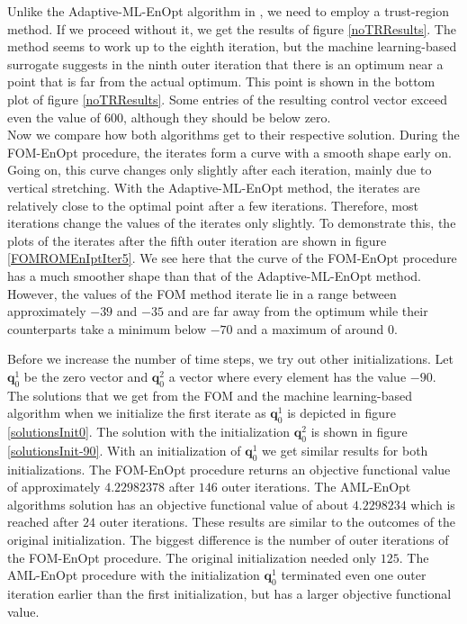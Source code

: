 Unlike the Adaptive-ML-EnOpt algorithm in \cite{Keil2022-dj}, we need to employ a trust-region method. If we proceed without it, we get the results of figure \ref{noTRResults}. The method seems to work up to the eighth iteration, but the machine learning-based surrogate suggests in the ninth outer iteration that there is an optimum near a point that is far from the actual optimum. This point is shown in the bottom plot of figure \ref{noTRResults}. Some entries of the resulting control vector exceed even the value of $600$, although they should be below zero.\\

Now we compare how both algorithms get to their respective solution. During the FOM-EnOpt procedure, the iterates form a curve with a smooth shape early on. Going on, this curve changes only slightly after each iteration, mainly due to vertical stretching. With the Adaptive-ML-EnOpt method, the iterates are relatively close to the optimal point after a few iterations. Therefore, most iterations change the values of the iterates only slightly. To demonstrate this, the plots of the iterates after the fifth outer iteration are shown in figure \ref{FOMROMEnIptIter5}. We see here that the curve of the FOM-EnOpt procedure has a much smoother shape than that of the Adaptive-ML-EnOpt method. However, the values of the FOM method iterate lie in a range between approximately $-39$ and $-35$ and are far away from the optimum while their counterparts take a minimum below $-70$ and a maximum of around $0$.

Before we increase the number of time steps, we try out other initializations. Let $\mathbf{q}^1_0$ be the zero vector and $\mathbf{q}^2_0$ a vector where every element has the value $-90$. The solutions that we get from the FOM and the machine learning-based algorithm when we initialize the first iterate as $\mathbf{q}^1_0$ is depicted in figure \ref{solutionsInit0}. The solution with the initialization $\mathbf{q}^2_0$ is shown in figure \ref{solutionsInit-90}. With an initialization of $\mathbf{q}^1_0$ we get similar results for both initializations. The FOM-EnOpt procedure returns an objective functional value of approximately $4.22982378$ after $146$ outer iterations. The AML-EnOpt algorithms solution has an objective functional value of about $4.2298234$ which is reached after $24$ outer iterations. These results are similar to the outcomes of the original initialization. The biggest difference is the number of outer iterations of the FOM-EnOpt procedure. The original initialization needed only $125$. The AML-EnOpt procedure with the initialization $\mathbf{q}^1_0$ terminated even one outer iteration earlier than the first initialization, but has a larger objective functional value.

